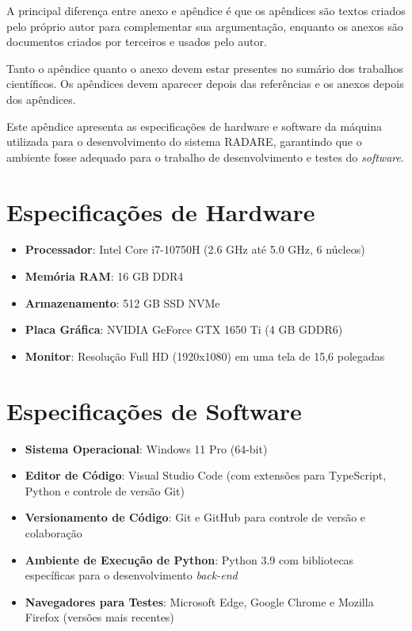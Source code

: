 \label{Cap:anexo}

A principal diferença entre anexo e apêndice é que os apêndices são textos criados pelo próprio autor para complementar sua argumentação, enquanto os anexos são documentos criados por terceiros e usados pelo autor.

Tanto o apêndice quanto o anexo devem estar presentes no sumário dos trabalhos científicos. Os apêndices devem aparecer depois das referências e os anexos depois dos apêndices.



\label{Ap:configuracaoMaquina}

Este apêndice apresenta as especificações de hardware e software da máquina utilizada para o desenvolvimento do sistema RADARE, garantindo que o ambiente fosse adequado para o trabalho de desenvolvimento e testes do \textit{software}.

\section{Especificações de Hardware}
\begin{itemize}
    \item \textbf{Processador}: Intel Core i7-10750H (2.6 GHz até 5.0 GHz, 6 núcleos)
    \item \textbf{Memória RAM}: 16 GB DDR4
    \item \textbf{Armazenamento}: 512 GB SSD NVMe
    \item \textbf{Placa Gráfica}: NVIDIA GeForce GTX 1650 Ti (4 GB GDDR6)
    \item \textbf{Monitor}: Resolução Full HD (1920x1080) em uma tela de 15,6 polegadas
\end{itemize}

\section{Especificações de Software}
\begin{itemize}
    \item \textbf{Sistema Operacional}: Windows 11 Pro (64-bit)
    \item \textbf{Editor de Código}: Visual Studio Code (com extensões para TypeScript, Python e controle de versão Git)
    \item \textbf{Versionamento de Código}: Git e GitHub para controle de versão e colaboração
    \item \textbf{Ambiente de Execução de Python}: Python 3.9 com bibliotecas específicas para o desenvolvimento \textit{back-end}
    \item \textbf{Navegadores para Testes}: Microsoft Edge, Google Chrome e Mozilla Firefox (versões mais recentes)
\end{itemize}

